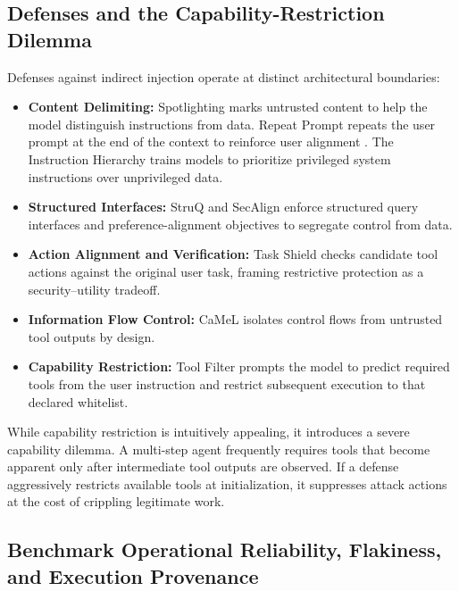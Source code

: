 \subsection{Defenses and the Capability-Restriction Dilemma}

Defenses against indirect injection operate at distinct architectural boundaries:
\begin{itemize}
    \item \textbf{Content Delimiting:} Spotlighting \cite{hines2024spotlighting} marks untrusted content to help the model distinguish instructions from data. Repeat Prompt repeats the user prompt at the end of the context to reinforce user alignment \cite{perez2022ignore}. The Instruction Hierarchy \cite{wallace2024instruction} trains models to prioritize privileged system instructions over unprivileged data.
    \item \textbf{Structured Interfaces:} StruQ \cite{chen2025struq} and SecAlign \cite{chen2025secalign} enforce structured query interfaces and preference-alignment objectives to segregate control from data.
    \item \textbf{Action Alignment and Verification:} Task Shield \cite{jia2025taskshield} checks candidate tool actions against the original user task, framing restrictive protection as a security--utility tradeoff.
    \item \textbf{Information Flow Control:} CaMeL \cite{debenedetti2026camel} isolates control flows from untrusted tool outputs by design.
    \item \textbf{Capability Restriction:} Tool Filter \cite{debenedetti2024agentdojo} prompts the model to predict required tools from the user instruction and restrict subsequent execution to that declared whitelist.
\end{itemize}

While capability restriction is intuitively appealing, it introduces a severe capability dilemma. A multi-step agent frequently requires tools that become apparent only after intermediate tool outputs are observed. If a defense aggressively restricts available tools at initialization, it suppresses attack actions at the cost of crippling legitimate work.

\subsection{Benchmark Operational Reliability, Flakiness, and Execution Provenance}

